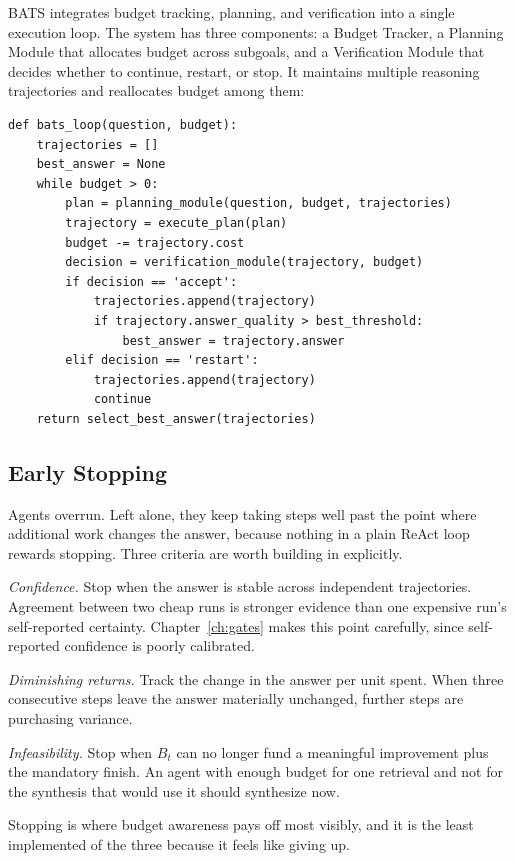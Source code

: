 \documentclass[11pt]{book}
\begin{document}
BATS \cite{bats2025} integrates budget tracking, planning, and verification into a single execution loop. The system has three components: a Budget Tracker, a Planning Module that allocates budget across subgoals, and a Verification Module that decides whether to continue, restart, or stop. It maintains multiple reasoning trajectories and reallocates budget among them:

{\footnotesize
\begin{verbatim}
def bats_loop(question, budget):
    trajectories = []
    best_answer = None
    while budget > 0:
        plan = planning_module(question, budget, trajectories)
        trajectory = execute_plan(plan)
        budget -= trajectory.cost
        decision = verification_module(trajectory, budget)
        if decision == 'accept':
            trajectories.append(trajectory)
            if trajectory.answer_quality > best_threshold:
                best_answer = trajectory.answer
        elif decision == 'restart':
            trajectories.append(trajectory)
            continue
    return select_best_answer(trajectories)
\end{verbatim}
}

\subsection{Early Stopping}

Agents overrun. Left alone, they keep taking steps well past the point where additional work changes the answer, because nothing in a plain ReAct loop rewards stopping. Three criteria are worth building in explicitly.

\textit{Confidence.} Stop when the answer is stable across independent trajectories. Agreement between two cheap runs is stronger evidence than one expensive run's self-reported certainty. Chapter~\ref{ch:gates} makes this point carefully, since self-reported confidence is poorly calibrated.

\textit{Diminishing returns.} Track the change in the answer per unit spent. When three consecutive steps leave the answer materially unchanged, further steps are purchasing variance.

\textit{Infeasibility.} Stop when $B_t$ can no longer fund a meaningful improvement plus the mandatory finish. An agent with enough budget for one retrieval and not for the synthesis that would use it should synthesize now.

Stopping is where budget awareness pays off most visibly, and it is the least implemented of the three because it feels like giving up.
\end{document}
